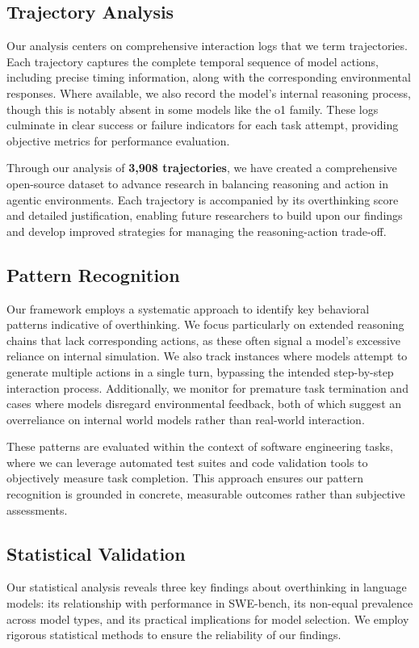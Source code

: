 \subsection{Trajectory Analysis}
Our analysis centers on comprehensive interaction logs that we term trajectories. Each trajectory captures the complete temporal sequence of model actions, including precise timing information, along with the corresponding environmental responses. Where available, we also record the model's internal reasoning process, though this is notably absent in some models like the o1 family. These logs culminate in clear success or failure indicators for each task attempt, providing objective metrics for performance evaluation.

Through our analysis of \textbf{3,908 trajectories}, we have created a comprehensive open-source dataset to advance research in balancing reasoning and action in agentic environments. Each trajectory is accompanied by its overthinking score and detailed justification, enabling future researchers to build upon our findings and develop improved strategies for managing the reasoning-action trade-off.

\subsection{Pattern Recognition}
Our framework employs a systematic approach to identify key behavioral patterns indicative of overthinking. We focus particularly on extended reasoning chains that lack corresponding actions, as these often signal a model's excessive reliance on internal simulation. We also track instances where models attempt to generate multiple actions in a single turn, bypassing the intended step-by-step interaction process. Additionally, we monitor for premature task termination and cases where models disregard environmental feedback, both of which suggest an overreliance on internal world models rather than real-world interaction.

These patterns are evaluated within the context of software engineering tasks, where we can leverage automated test suites and code validation tools to objectively measure task completion. This approach ensures our pattern recognition is grounded in concrete, measurable outcomes rather than subjective assessments.

\subsection{Statistical Validation}
Our statistical analysis reveals three key findings about overthinking in language models: its relationship with performance in SWE-bench, its non-equal prevalence across model types, and its practical implications for model selection. We employ rigorous statistical methods to ensure the reliability of our findings.

